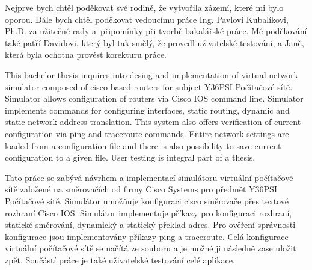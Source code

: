 \documentclass[11pt,twoside,a4paper]{book}
\begin{document}

\coverpagestarts


\acknowledgements
\noindent

Nejprve bych chtěl poděkovat své rodině, že vytvořila zázemí, které mi bylo oporou. Dále bych chtěl poděkovat vedoucímu práce Ing. Pavlovi Kubalíkovi, Ph.D. za užitečné rady a~připomínky při tvorbě bakalářské práce. Mé poděkování také patří Davidovi, který byl tak smělý, že provedl uživatelské testování, a Janě, která byla ochotna provést korekturu práce.






 
\abstractpage

This bachelor thesis inquires into desing and implementation of virtual network simulator composed of cisco-based routers for subject Y36PSI Počítačové sítě. Simulator allows configuration of routers via Cisco IOS command line. Simulator implements commands for configuring interfaces, static routing, dynamic and static network address translation. This system also offers verification of current configuration via ping and traceroute commands. Entire network settings are loaded from a configuration file and there is also possibility to save current configuration to a given file. User testing is integral part of a thesis.




\baselineskip

\noindent


Tato práce se zabývá návrhem a implementací simulátoru virtuální počítačové sítě založené na směrovačích od firmy Cisco Systems pro předmět Y36PSI Počítačové sítě. Simulátor umožňuje konfiguraci cisco směrovače přes textové rozhraní Cisco IOS. Simulátor implementuje příkazy pro konfiguraci rozhraní, statické směrování, dynamický a statický překlad adres. Pro ověření správnosti konfigurace jsou implementovány příkazy ping a traceroute. Celá konfigurace virtuální počítačové sítě se načítá ze souboru a je možné ji následně zase uložit zpět. Součástí práce je také uživatelské testování celé aplikace.
\end{document}
